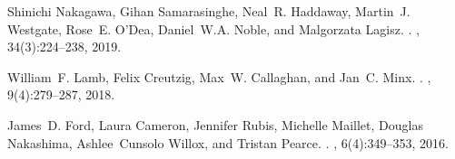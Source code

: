 \documentclass{article}
\begin{document}
\begin{thebibliography}{10}
		Shinichi Nakagawa, Gihan Samarasinghe, Neal~R. Haddaway, Martin~J. Westgate,
		Rose~E. O'Dea, Daniel~W.A. Noble, and Malgorzata Lagisz.
		.
		, 34(3):224--238, 2019.
		
		William~F. Lamb, Felix Creutzig, Max~W. Callaghan, and Jan~C. Minx.
		.
		, 9(4):279--287, 2018.
		
		James~D. Ford, Laura Cameron, Jennifer Rubis, Michelle Maillet, Douglas
		Nakashima, Ashlee~Cunsolo Willox, and Tristan Pearce.
		.
		, 6(4):349--353, 2016.
		
	\end{thebibliography}
	
	
	
	
\end{document}
